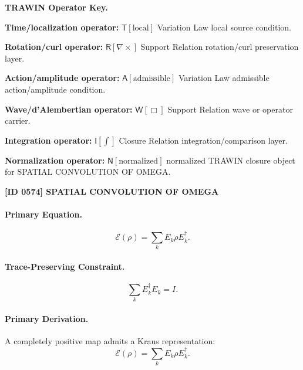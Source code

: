 \par\vspace{0.45\baselineskip}
\noindent\begin{minipage}[t]{\linewidth}
\begingroup
\small
\raggedright
\textbf{TRAWIN Operator Key.}\par
\noindent\textbf{Time/localization operator:} $\mathsf{T}\!\left[\mathrm{local}\right]$ Variation Law local source condition.\par
\noindent\textbf{Rotation/curl operator:} $\mathsf{R}\!\left[\nabla\times\right]$ Support Relation rotation/curl preservation layer.\par
\noindent\textbf{Action/amplitude operator:} $\mathsf{A}\!\left[\mathrm{admissible}\right]$ Variation Law admissible action/amplitude condition.\par
\noindent\textbf{Wave/d'Alembertian operator:} $\mathsf{W}\!\left[\Box\right]$ Support Relation wave or operator carrier.\par
\noindent\textbf{Integration operator:} $\mathsf{I}\!\left[\int\right]$ Closure Relation integration/comparison layer.\par
\noindent\textbf{Normalization operator:} $\mathsf{N}\!\left[\mathrm{normalized}\right]$ normalized TRAWIN closure object for SPATIAL CONVOLUTION OF OMEGA.\par
\endgroup
\end{minipage}

\clearpage
\noindent\textbf{[ID 0574] SPATIAL CONVOLUTION OF OMEGA}\par
\vspace{0.35em}
\paragraph{Primary Equation.}
\begin{equation}
\mathcal{E}(\rho)=\sum_k E_k\rho E_k^\dagger .
\end{equation}

\paragraph{Trace-Preserving Constraint.}
\begin{equation}
\sum_k E_k^\dagger E_k = I .
\end{equation}

\paragraph{Primary Derivation.}
A completely positive map admits a Kraus representation:
\begin{equation}
\mathcal{E}(\rho)=\sum_k E_k\rho E_k^\dagger .
\end{equation}

